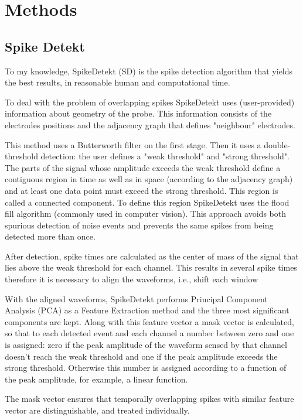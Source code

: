 
\section{Methods}
\label{sec:methods}
\subsection{Spike Detekt}
\label{subsec:spikedetekt}

To my knowledge, SpikeDetekt (SD) \cite{Rossant2016} is the spike detection algorithm that yields the best results, in reasonable human and computational time. 

To deal with the problem of overlapping spikes SpikeDetekt uses (user-provided) information about geometry of the probe. This information consists of the electrodes positions and the adjacency graph that defines "neighbour" electrodes. 

This method uses a Butterworth filter on the first stage. Then it uses a double-threshold detection: the user defines a "weak threshold" and "strong threshold". The parts of the signal whose amplitude exceeds the weak threshold define a contiguous region in time as well as in space (according to the adjacency graph) and at least one data point must exceed the strong threshold. This region is called a connected component. To define this region SpikeDetekt uses the flood fill algorithm (commonly used in computer vision). This approach avoids both spurious detection of noise events and prevents the same spikes from being detected more than once.
 
After detection, spike times are calculated as the center of mass of the signal that lies above the weak threshold for each channel. This results in several spike times therefore it is necessary to align the waveforms, i.e., shift each window 

With the aligned waveforms, SpikeDetekt performs Principal Component Analysis (PCA) as a Feature Extraction method and the three most significant components are kept. Along with this feature vector a mask vector is calculated, so that to each detected event and each channel a number between zero and one is assigned: zero if the peak amplitude of the waveform sensed by that channel doesn't reach the weak threshold and one if the peak amplitude exceeds the strong threshold. Otherwise this number is assigned according to a function of the peak amplitude, for example, a linear function.

The mask vector ensures that temporally overlapping spikes with similar feature vector are distinguishable, and treated individually.

